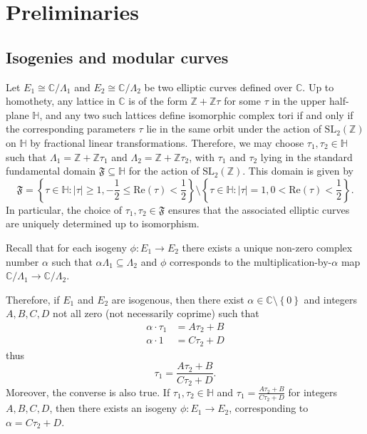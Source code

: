 \documentclass[11pt,a4paper,reqno]{amsart}
\numberwithin{equation}{section}
\newcommand{\Z}{\mathbb{Z}}
\newcommand{\C}{\mathbb{C}}
\renewcommand{\H}{\mathbb{H}}
\renewcommand{\a}{\alpha}
\newcommand{\pg}[1]{\left\lbrace #1 \right\rbrace}
\newcommand{\abs}[1]{\left| #1 \right|}
\renewcommand{\Re}{\mathrm{Re}}
\theoremstyle{remark}
\theoremstyle{definition}
\theoremstyle{definition}
\begin{document}
\section{Preliminaries}

\subsection{Isogenies and modular curves}\label{sect_isog}
Let $E_1 \cong \C/\Lambda_1$ and $E_2 \cong \C/\Lambda_2$ be two elliptic curves defined over $\C$. Up to homothety, any lattice in $\C$ is of the form $\Z + \Z\tau$ for some $\tau$ in the upper half-plane $\mathbb{H}$, and any two such lattices define isomorphic complex tori if and only if the corresponding parameters $\tau$ lie in the same orbit under the action of $\mathrm{SL}_2(\Z)$ on $\mathbb{H}$ by fractional linear transformations. Therefore, we may choose $\tau_1, \tau_2 \in \mathbb{H}$ such that $\Lambda_1 = \Z + \Z\tau_1$ and $\Lambda_2 = \Z + \Z\tau_2$, with $\tau_1$ and $\tau_2$ lying in the standard fundamental domain $\mathfrak{F} \subseteq \mathbb{H}$ for the action of $\mathrm{SL}_2(\Z)$. This domain is given by
\begin{equation}\label{eqn:def_fund_dom}
\mathfrak{F}= \pg{\tau \in \mathbb{H}: \abs{\tau}\geq 1, -\frac{1}{2} \leq \Re(\tau) < \frac{1}{2}} \setminus \pg{\tau \in \mathbb{H}: \abs{\tau}= 1, 0 < \Re(\tau) < \frac{1}{2}}.
\end{equation}
In particular, the choice of $\tau_1, \tau_2 \in \mathfrak{F}$ ensures that the associated elliptic curves are uniquely determined up to isomorphism.

Recall that for each isogeny $ \phi:E_1 \rightarrow E_2 $ there exists a unique non-zero complex number $ \a $ such that $ \a \Lambda_1 \subseteq \Lambda_2 $ and $\phi$ corresponds to the multiplication-by-$\a$ map $ \C/\Lambda_1 \rightarrow \C/\Lambda_2$.

Therefore, if $ E_1 $ and $ E_2 $ are isogenous, then there exist $ \a \in \C\setminus\pg{0}$ and integers $ A,B,C,D $  not all zero (not necessarily coprime) such that
\begin{align*}
	\a\cdot \tau_1&= A\tau_2+B\\
	\a\cdot 1&= C\tau_2+D
\end{align*}
thus \[ \tau_1 =\dfrac{A\tau_2+B}{C\tau_2+D}. \]
Moreover, the converse is also true. If $\tau_1, \tau_2 \in \H$ and $\tau_1 =\frac{A\tau_2+B}{C\tau_2+D}$ for integers $A,B,C,D$, then there exists an isogeny $ \phi:E_1\rightarrow E_2$, corresponding to $ \a=C\tau_2+D$.
\end{document}
